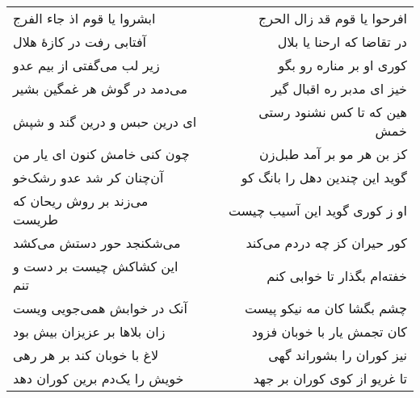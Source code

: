 \begin{center}
\begin{longtable}{l p{0.5cm} r}
\\
ابشروا یا قوم اذ جاء الفرج
&&
افرحوا یا قوم قد زال الحرج
\\
آفتابی رفت در کازهٔ هلال
&&
در تقاضا که ارحنا یا بلال
\\
زیر لب می‌گفتی از بیم عدو
&&
کوری او بر مناره رو بگو
\\
می‌دمد در گوش هر غمگین بشیر
&&
خیز ای مدبر ره اقبال گیر
\\
ای درین حبس و درین گند و شپش
&&
هین که تا کس نشنود رستی خمش
\\
چون کنی خامش کنون ای یار من
&&
کز بن هر مو بر آمد طبل‌زن
\\
آن‌چنان کر شد عدو رشک‌خو
&&
گوید این چندین دهل را بانگ کو
\\
می‌زند بر روش ریحان که طریست
&&
او ز کوری گوید این آسیب چیست
\\
می‌شکنجد حور دستش می‌کشد
&&
کور حیران کز چه دردم می‌کند
\\
این کشاکش چیست بر دست و تنم
&&
خفته‌ام بگذار تا خوابی کنم
\\
آنک در خوابش همی‌جویی ویست
&&
چشم بگشا کان مه نیکو پیست
\\
زان بلاها بر عزیزان بیش بود
&&
کان تجمش یار با خوبان فزود
\\
لاغ با خوبان کند بر هر رهی
&&
نیز کوران را بشوراند گهی
\\
خویش را یک‌دم برین کوران دهد
&&
تا غریو از کوی کوران بر جهد
\\
\end{longtable}
\end{center}
